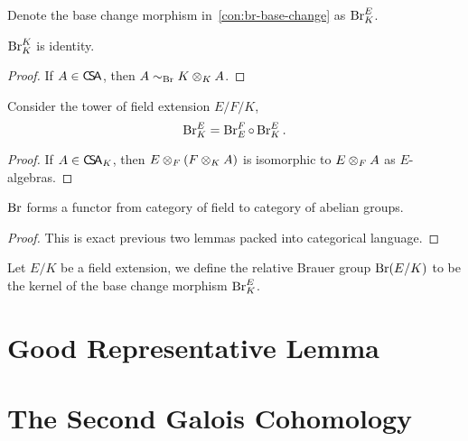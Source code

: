  Denote the base change morphism in~\cref{con:br-base-change} as $\operatorname{Br}_{K}^{E}$.
 \begin{lemma}
   $\operatorname{Br}_{K}^{K}$ is identity.
   \leanok
 \end{lemma}
 \begin{proof}
   If $A\in\operatorname{\mathsf{C}\!\mathsf{S}\!\mathsf{A}}$, then $A\sim_{\operatorname{Br}}K\otimes_{K}A$.
 \end{proof}

 \begin{lemma}
   Consider the tower of field extension $E/F/K$,
   \[
     \operatorname{Br}_{K}^{E} = \operatorname{Br}_{E}^{F}\circ\operatorname{Br}_{K}^{E}.
   \]
 \end{lemma}

 \begin{proof}
   If $A\in\operatorname{\mathsf{C}\!\mathsf{S}\!\mathsf{A}}_{K}$, then $E\otimes_{F}\left(F\otimes_{K}A\right)$ is isomorphic to $E \otimes_{F} A$ as $E$-algebras.
   \leanok
 \end{proof}

 \begin{corollary}
   $\operatorname{Br}$ forms a functor from category of field to category of abelian groups.
   \leanok
 \end{corollary}
 \begin{proof}
   This is exact previous two lemmas packed into categorical language.
 \end{proof}

 \begin{definition}
   Let $E/K$ be a field extension, we define the relative Brauer group $\operatorname{Br}(E/K)$ to be the kernel of the base change morphism $\operatorname{Br}_{K}^{E}$.
 \end{definition}

 \section{Good Representative Lemma}

\section{The Second Galois Cohomology}

